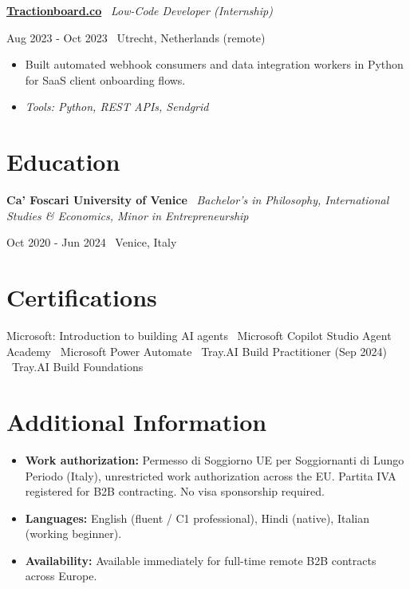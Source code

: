 \documentclass[a4paper,10pt]{article}
\newcommand{\role}[4]{%
  \vspace{2pt}\noindent
  \begin{minipage}[t]{0.70\textwidth}\raggedright\textbf{#1} \textbullet\ \textit{#3}\end{minipage}%
  \hfill
  \begin{minipage}[t]{0.28\textwidth}\raggedleft\footnotesize\color{gray}#2 \textbullet\ #4\end{minipage}%
  \vspace{1pt}%
}
\begin{document}
\role{\href{https://tractionboard.co}{Tractionboard.co}}{Aug 2023 - Oct 2023}{Low-Code Developer (Internship)}{Utrecht, Netherlands (remote)}
\begin{itemize}
  \item Built automated webhook consumers and data integration workers in Python for SaaS client onboarding flows.
  \item \textit{Tools: Python, REST APIs, Sendgrid}
\end{itemize}

\section{Education}
\role{Ca' Foscari University of Venice}{Oct 2020 - Jun 2024}{Bachelor's in Philosophy, International Studies \& Economics, Minor in Entrepreneurship}{Venice, Italy}

\section{Certifications}
Microsoft: Introduction to building AI agents \textbullet\ Microsoft Copilot Studio Agent Academy \textbullet\ Microsoft Power Automate \textbullet\ Tray.AI Build Practitioner (Sep 2024) \textbullet\ Tray.AI Build Foundations

\section{Additional Information}
\begin{itemize}
  \item \textbf{Work authorization:} Permesso di Soggiorno UE per Soggiornanti di Lungo Periodo (Italy), unrestricted work authorization across the EU. Partita IVA registered for B2B contracting. No visa sponsorship required.
  \item \textbf{Languages:} English (fluent / C1 professional), Hindi (native), Italian (working beginner).
  \item \textbf{Availability:} Available immediately for full-time remote B2B contracts across Europe.
\end{itemize}

\end{document}
